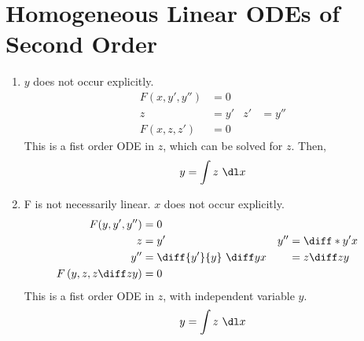 \section{Homogeneous Linear ODEs of Second Order}

\begin{enumerate}
    \item $ y $ does not occur explicitly.
          \begin{align}
              F(x, y', y'') & = 0               \\
              z             & = y' & z' & = y'' \\
              F(x, z, z')   & = 0
          \end{align}
          This is a fist order ODE in $ z $, which can be solved for $ z $. Then,
          \begin{align}
              y = \int z\ \dl x
          \end{align}

    \item F is not necessarily linear. $ x $ does not occur explicitly.
          \begin{align}
              F(y, y', y'')                    & = 0                                                \\
              z                                & = y'                      & y'' & = \diff* {y'}{x} \\
              y''                              & = \diff {y'}{y}\ \diff yx &     & = z \diff zy     \\
              F\left( y, z, z \diff zy \right) & = 0
          \end{align}
          This is a fist order ODE in $ z $, with independent variable $ y $.
          \begin{align}
              y = \int z\ \dl x
          \end{align}


\end{enumerate}
